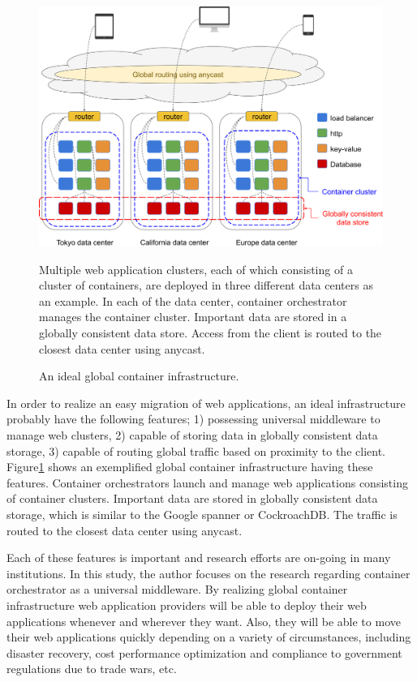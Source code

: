 \begin{figure}[h]
\begin{center}
\includegraphics[width=0.9\columnwidth]{Figs/global_container_infrastructure}
\end{center}
\caption{
An ideal global container infrastructure.
}
\centering\parbox[c]{0.9\columnwidth}{
Multiple web application clusters, each of which consisting of a cluster of containers, are deployed in three different data centers as an example.
In each of the data center, container orchestrator manages the container cluster.
Important data are stored in a globally consistent data store.
Access from the client is routed to the closest data center using anycast.
}
\label{fig:global_container_infrastructure}
\end{figure}


In order to realize an easy migration of web applications, an ideal infrastructure probably have the following features;
1) possessing universal middleware to manage web clusters,
2) capable of storing data in globally consistent data storage,
3) capable of routing global traffic based on proximity to the client.
%
Figure\ref{fig:global_container_infrastructure} shows an exemplified global container infrastructure having these features.
Container orchestrators launch and manage web applications consisting of container clusters.
Important data are stored in globally consistent data storage, which is similar to the Google spanner\cite{Corbett:2013:SGG:2518037.2491245,Cooper:2013:SGG:2485732.2485756} or CockroachDB\cite{pavlo2016s}.
The traffic is routed to the closest data center using anycast\cite{rfc1546}.

Each of these features is important and research efforts are on-going in many institutions.
In this study, the author focuses on the research regarding container orchestrator as a universal middleware.
%
By realizing global container infrastructure web application providers will be able to deploy their web applications whenever and wherever they want.
Also, they will be able to move their web applications quickly depending on a variety of circumstances, including disaster recovery, cost performance optimization and compliance to government regulations due to trade wars, etc.


